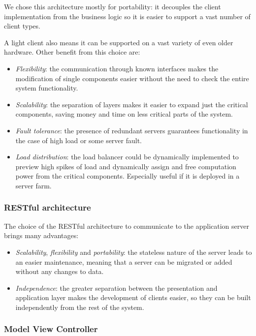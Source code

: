 \documentclass{article}
\begin{document}
    We chose this architecture mostly for portability: it decouples the client implementation from the business logic so it is easier to support a vast number of client types. \par
    A light client also means it can be supported on a vast variety of even older hardware. Other benefit from this choice are:
    
    \begin{itemize}
        \item \textit{Flexibility}: the communication through known interfaces makes the modification of single components easier without the need to check the entire system functionality.
        \item \textit{Scalability}: the separation of layers makes it easier to expand just the critical components, saving money and time on less critical parts of the system.
        \item \textit{Fault tolerance}: the presence of redundant servers guarantees functionality in the case of high load or some server fault.
        \item \textit{Load distribution}: the load balancer could be dynamically implemented to preview high spikes of load and dynamically assign and free computation power from the critical components. Especially useful if it is deployed in a server farm.
    \end{itemize}
    
    \subsubsection{RESTful architecture}

    The choice of the RESTful architecture to communicate to the application server brings many advantages:
    
    \begin{itemize}
        \item \textit{Scalability}, \textit{flexibility} and \textit{portability}: the stateless nature of the server leads to an easier maintenance, meaning that a server can be migrated or added without any changes to data.
        \item \textit{Independence}: the greater separation between the presentation and application layer makes the development of clients easier, so they can be built independently from the rest of the system.
    \end{itemize}
    
    \subsubsection{Model View Controller}
    
\end{document}
